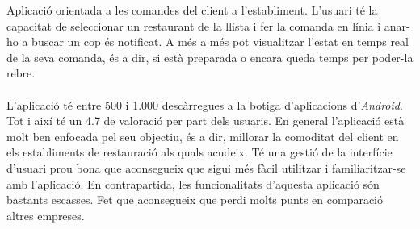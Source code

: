 Aplicació\cite{primetray} orientada a les comandes del client a l'establiment. L'usuari té la capacitat de seleccionar un restaurant de la llista i fer la comanda en línia i anar-ho a buscar un cop és notificat. A més a més pot visualitzar l'estat en temps real de la seva comanda, és a dir, si està preparada o encara queda temps per poder-la rebre.
\\\\
L'aplicació té entre 500 i 1.000 descàrregues a la botiga d'aplicacions d'\textit{Android}. Tot i així té un 4.7 de valoració per part dels usuaris. En general l'aplicació està molt ben enfocada pel seu objectiu, és a dir, millorar la comoditat del client en els establiments de restauració als quals acudeix. Té una gestió de la interfície d'usuari prou bona que aconsegueix que sigui més fàcil utilitzar i familiaritzar-se amb l'aplicació. En contrapartida, les funcionalitats d'aquesta aplicació són bastants escasses. Fet que aconsegueix que perdi molts punts en comparació altres empreses.
\\
